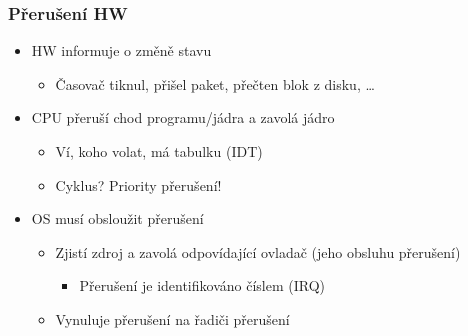 \begin{frame}
  \frametitle{Přerušení HW}

  \begin{itemize}
    \item HW informuje o změně stavu
    \begin{itemize}
      \item Časovač tiknul, přišel paket, přečten blok z disku, \dots
    \end{itemize}

    \pause

    \item CPU přeruší chod programu/jádra a zavolá jádro
    \begin{itemize}
      \item Ví, koho volat, má tabulku (IDT)
      \item Cyklus? Priority přerušení!
    \end{itemize}

    \pause

    \item OS musí obsloužit přerušení
    \begin{itemize}
      \item Zjistí zdroj a zavolá odpovídající ovladač (jeho obsluhu přerušení)
      \begin{itemize}
	\item Přerušení je identifikováno číslem (IRQ)
      \end{itemize}

      \item Vynuluje přerušení na řadiči přerušení
    \end{itemize}
  \end{itemize}

  \pause
  \bigskip


\end{frame}

